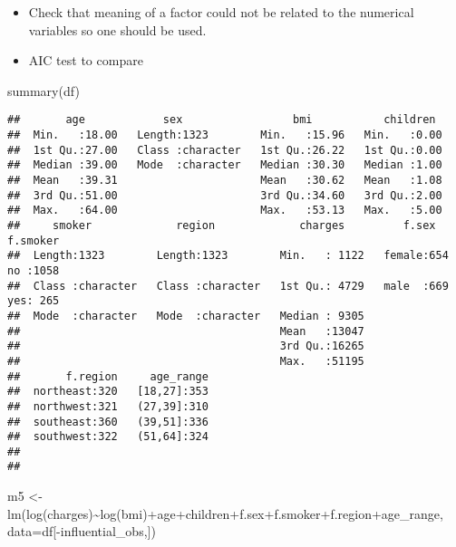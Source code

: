 \documentclass[
]{article}
\newenvironment{Shaded}{\begin{snugshade}}{\end{snugshade}}
\newcommand{\AttributeTok}[1]{\textcolor[rgb]{0.77,0.63,0.00}{#1}}
\newcommand{\FunctionTok}[1]{\textcolor[rgb]{0.00,0.00,0.00}{#1}}
\newcommand{\NormalTok}[1]{#1}
\newcommand{\OtherTok}[1]{\textcolor[rgb]{0.56,0.35,0.01}{#1}}
\newcommand{\SpecialCharTok}[1]{\textcolor[rgb]{0.00,0.00,0.00}{#1}}
\begin{document}
\begin{itemize}
\item
  Check that meaning of a factor could not be related to the numerical
  variables so one should be used.
\item
  AIC test to compare
\end{itemize}

\begin{Shaded}
\begin{Highlighting}[]
\FunctionTok{summary}\NormalTok{(df)}
\end{Highlighting}
\end{Shaded}

\begin{verbatim}
##       age            sex                 bmi           children   
##  Min.   :18.00   Length:1323        Min.   :15.96   Min.   :0.00  
##  1st Qu.:27.00   Class :character   1st Qu.:26.22   1st Qu.:0.00  
##  Median :39.00   Mode  :character   Median :30.30   Median :1.00  
##  Mean   :39.31                      Mean   :30.62   Mean   :1.08  
##  3rd Qu.:51.00                      3rd Qu.:34.60   3rd Qu.:2.00  
##  Max.   :64.00                      Max.   :53.13   Max.   :5.00  
##     smoker             region             charges         f.sex     f.smoker  
##  Length:1323        Length:1323        Min.   : 1122   female:654   no :1058  
##  Class :character   Class :character   1st Qu.: 4729   male  :669   yes: 265  
##  Mode  :character   Mode  :character   Median : 9305                          
##                                        Mean   :13047                          
##                                        3rd Qu.:16265                          
##                                        Max.   :51195                          
##       f.region     age_range  
##  northeast:320   [18,27]:353  
##  northwest:321   (27,39]:310  
##  southeast:360   (39,51]:336  
##  southwest:322   (51,64]:324  
##                               
## 
\end{verbatim}

\begin{Shaded}
\begin{Highlighting}[]
\NormalTok{m5 }\OtherTok{\textless{}{-}} \FunctionTok{lm}\NormalTok{(}\FunctionTok{log}\NormalTok{(charges)}\SpecialCharTok{\textasciitilde{}}\FunctionTok{log}\NormalTok{(bmi)}\SpecialCharTok{+}\NormalTok{age}\SpecialCharTok{+}\NormalTok{children}\SpecialCharTok{+}\NormalTok{f.sex}\SpecialCharTok{+}\NormalTok{f.smoker}\SpecialCharTok{+}\NormalTok{f.region}\SpecialCharTok{+}\NormalTok{age\_range, }\AttributeTok{data=}\NormalTok{df[}\SpecialCharTok{{-}}\NormalTok{influential\_obs,])}
\end{Highlighting}
\end{Shaded}
\end{document}
